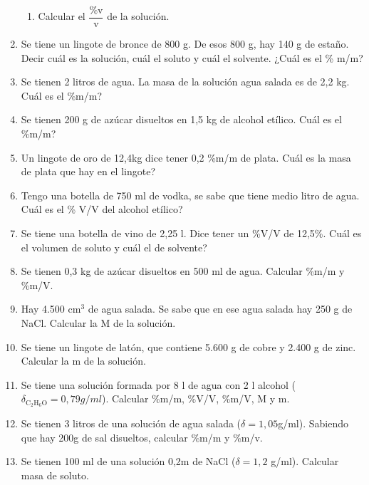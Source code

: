 \begin{enumerate}
\begin{enumerate}
    \item Calcular el $\dfrac{\%\text{v}}{\text{v}}$ de la solución.
\end{enumerate}


\item Se tiene un lingote de bronce de 800 g. De esos 800 g, hay 140 g de estaño. Decir cuál es la solución, cuál el soluto y cuál el solvente. ¿Cuál es el \% m/m? %

\item Se tienen 2 litros de agua. La masa de la solución agua salada es de 2,2 kg. Cuál es el \%m/m? %

\item Se tienen 200 g de azúcar disueltos en 1,5 kg de alcohol etílico. Cuál es el \%m/m? %

\item Un lingote de oro de 12,4kg dice tener 0,2 \%m/m de plata. Cuál es la masa de plata que hay en el lingote?

\item Tengo una botella de 750 ml de vodka, se sabe que tiene medio litro de agua. Cuál es el \% V/V del alcohol etílico?

\item Se tiene una botella de vino de 2,25 l. Dice tener un \%V/V de 12,5\%. Cuál es el volumen de soluto y cuál el de solvente?

\item Se tienen 0,3 kg de azúcar disueltos en 500 ml de agua. Calcular \%m/m y \%m/V.

\item Hay 4.500 cm$^3$ de agua salada. Se sabe que en ese agua salada hay 250 g de NaCl. Calcular la M de la solución. %

\item Se tiene un lingote de latón, que contiene 5.600 g de cobre y 2.400 g de zinc. Calcular la m de la solución. %

\item Se tiene una solución formada por 8 l de agua con 2 l  alcohol ($\delta_{\text{C}_2\text{H}_6\text{O}}=0,79 g/ml$). Calcular \%m/m, \%V/V, \%m/V, M y m.

\item Se tienen 3 litros de una solución de agua salada ($\delta = 1,05$g/ml). Sabiendo que hay 200g de sal disueltos, calcular \%m/m y \%m/v. %

\item Se tienen 100 ml de una solución 0,2m de NaCl ($\delta = 1,2$ g/ml). Calcular masa de soluto. %
\end{enumerate}

